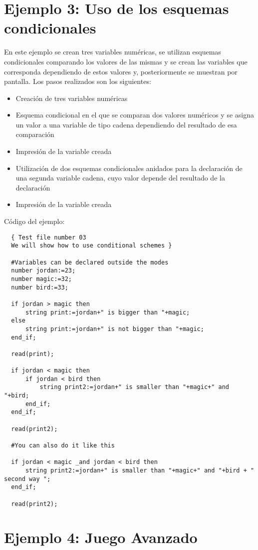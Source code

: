\documentclass[a4paper,12pt,twoside,openright]{report}
\begin{document}
  \section{Ejemplo 3: Uso de los esquemas condicionales}
  En este ejemplo se crean tres variables numéricas, se utilizan esquemas condicionales comparando los valores de las mismas 
  y se crean las variables que corresponda dependiendo de estos valores y, posteriormente se muestran por pantalla.
  Los pasos realizados son los siguientes:
  \begin{itemize}
   \item Creación de tres variables numéricas
   \item Esquema condicional en el que se comparan dos valores numéricos y se asigna un valor a una variable de tipo cadena 
   dependiendo del resultado de esa comparación
   \item Impresión de la variable creada
   \item Utilización de dos esquemas condicionales anidados para la declaración de una segunda variable cadena, cuyo valor 
   depende del resultado de la declaración
   \item Impresión de la variable creada
  \end{itemize}
  
  Código del ejemplo:
  \begin{lstlisting}
  { Test file number 03
  We will show how to use conditional schemes }

  #Variables can be declared outside the modes
  number jordan:=23;
  number magic:=32;
  number bird:=33;

  if jordan > magic then
	  string print:=jordan+" is bigger than "+magic;
  else
	  string print:=jordan+" is not bigger than "+magic;
  end_if;

  read(print);

  if jordan < magic then
	  if jordan < bird then
		  string print2:=jordan+" is smaller than "+magic+" and "+bird;
	  end_if;
  end_if;

  read(print2);

  #You can also do it like this

  if jordan < magic _and jordan < bird then
	  string print2:=jordan+" is smaller than "+magic+" and "+bird + " second way ";
  end_if;

  read(print2);

  \end{lstlisting}

  \section{Ejemplo 4: Juego Avanzado}
  
\end{document}
